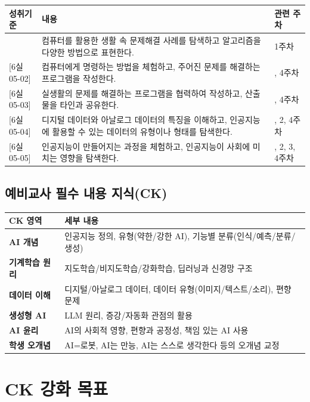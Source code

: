 \documentclass[a4paper,11pt]{article}
\begin{document}
\noindent
\begin{tabularx}{\textwidth}{|>{\centering\arraybackslash}p{2.2cm}|X|>{\centering\arraybackslash}p{2.8cm}|}
\hline
\textbf{성취기준} & \textbf{내용} & \textbf{관련 주차} \\ \hline
{[6실05-01]} & 컴퓨터를 활용한 생활 속 문제해결 사례를 탐색하고 알고리즘을 다양한 방법으로 표현한다. & 1주차 \\ \hline
{[6실05-02]} & 컴퓨터에게 명령하는 방법을 체험하고, 주어진 문제를 해결하는 프로그램을 작성한다. & 3, 4주차 \\ \hline
{[6실05-03]} & 실생활의 문제를 해결하는 프로그램을 협력하여 작성하고, 산출물을 타인과 공유한다. & 3, 4주차 \\ \hline
{[6실05-04]} & 디지털 데이터와 아날로그 데이터의 특징을 이해하고, 인공지능에 활용할 수 있는 데이터의 유형이나 형태를 탐색한다. & 1, 2, 4주차 \\ \hline
{[6실05-05]} & 인공지능이 만들어지는 과정을 체험하고, 인공지능이 사회에 미치는 영향을 탐색한다. & 1, 2, 3, 4주차 \\ \hline
\end{tabularx}

\subsection{예비교사 필수 내용 지식(CK)}

\noindent
\begin{tabularx}{\textwidth}{|>{\bfseries\arraybackslash}p{2.5cm}|X|}
\hline
\textbf{CK 영역} & \textbf{세부 내용} \\ \hline
AI 개념 & 인공지능 정의, 유형(약한/강한 AI), 기능별 분류(인식/예측/분류/생성) \\ \hline
기계학습 원리 & 지도학습/비지도학습/강화학습, 딥러닝과 신경망 구조 \\ \hline
데이터 이해 & 디지털/아날로그 데이터, 데이터 유형(이미지/텍스트/소리), 편향 문제 \\ \hline
생성형 AI & LLM 원리, 증강/자동화 관점의 활용 \\ \hline
AI 윤리 & AI의 사회적 영향, 편향과 공정성, 책임 있는 AI 사용 \\ \hline
학생 오개념 & AI=로봇, AI는 만능, AI는 스스로 생각한다 등의 오개념 교정 \\ \hline
\end{tabularx}

\section{CK 강화 목표}
\end{document}
